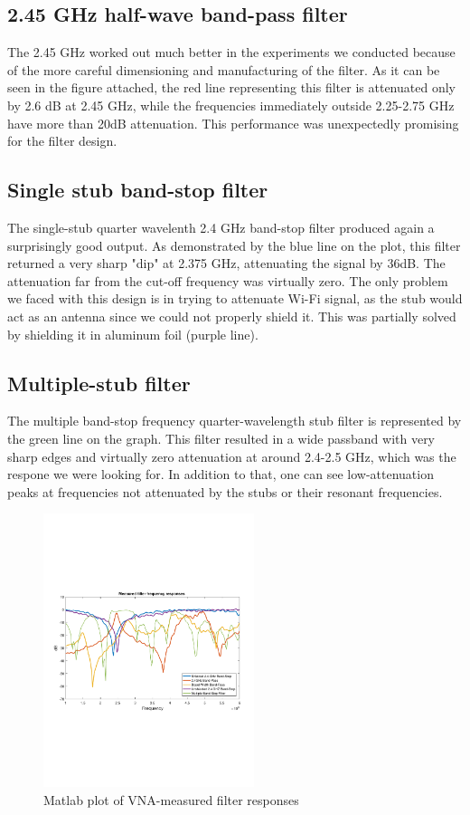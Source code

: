 \documentclass[letterpaper, 11pt, twocolumn]{article}
\begin{document}
\subsection{2.45 GHz half-wave band-pass filter} The 2.45 GHz worked out much
better in the experiments we conducted because of the more careful dimensioning
and manufacturing of the filter. As it can be seen in the figure attached, the
red line representing this filter is attenuated only by 2.6 dB at 2.45 GHz,
while the frequencies immediately outside 2.25-2.75 GHz have more than 20dB
attenuation. This performance was unexpectedly promising for the filter design.  

\subsection{Single stub band-stop filter}
The single-stub quarter wavelenth 2.4 GHz band-stop filter produced again a surprisingly good output. As demonstrated by the blue line on the plot, this filter returned a very sharp "dip" at 2.375 GHz, attenuating the signal by 36dB. The attenuation far from the cut-off frequency was virtually zero. The only problem we faced with this design is in trying to attenuate Wi-Fi signal, as the stub would act as an antenna since we could not properly shield it. This was partially solved by shielding it in aluminum foil (purple line). 

\subsection{Multiple-stub filter}
The multiple band-stop frequency quarter-wavelength stub filter is represented
by the green line on the graph. This filter resulted in a wide passband with
very sharp edges and virtually zero attenuation at around 2.4-2.5 GHz, which was
the respone we were looking for. In addition to that, one can see
low-attenuation peaks at frequencies not attenuated by the stubs or their
resonant frequencies. 

\begin{figure}[H]
    \centering
    \includegraphics[trim={0.5cm, 7.8cm, 0.2cm, 8cm}, clip=true, width=0.55\textwidth]{graph.pdf}
    \caption{Matlab plot of VNA-measured filter responses}
\end{figure}
\end{document}
